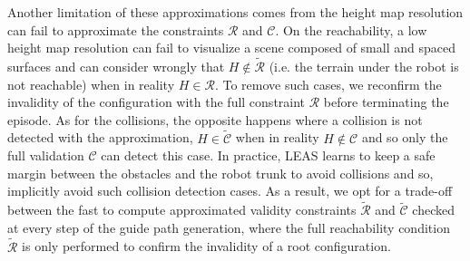 
Another limitation of these approximations comes from the height map resolution can fail to approximate the constraints $\mathcal{R}$ and $\mathcal{C}$.
On the reachability, a low height map resolution can fail to visualize a scene composed of small and spaced surfaces and can consider wrongly that $H \notin \tilde{\mathcal{R}}$ (i.e. the terrain under the robot is not reachable) when in reality $H \in \mathcal{R}$.
To remove such cases, we reconfirm the invalidity of the configuration with the full constraint $\mathcal{R}$ before terminating the episode.
As for the collisions, the opposite happens where a collision is not detected with the approximation, $H \in \tilde{\mathcal{C}}$ when in reality $H \notin \mathcal{C}$ and so only the full validation $\mathcal{C}$ can detect this case.
In practice, LEAS learns to keep a safe margin between the obstacles and the robot trunk to avoid collisions and so, implicitly avoid such collision detection cases.
As a result, we opt for a trade-off between the fast to compute approximated validity constraints $\tilde{\mathcal{R}}$ and $\tilde{\mathcal{C}}$ checked at every step of the guide path generation, where the full reachability condition $\tilde{\mathcal{R}}$ is only performed to confirm the invalidity of a root configuration.

